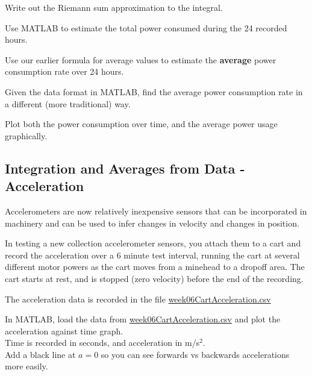 \newpage

\problem Write out the Riemann sum approximation to the integral.

\vfill
\vfill

Use MATLAB to estimate the total power consumed during the 24 recorded
hours.
\newpage

\problem Use our earlier formula for average values to estimate the
{\bf average} power consumption rate over 24 hours.

\vfill

Given the data format in MATLAB, find the average power consumption
rate in a different (more traditional) way.

\vfill

Plot both the power consumption over time, and the average power usage
graphically.  \vspace{1in}

\newpage

\subsection*{Integration and Averages from Data - Acceleration}

Accelerometers are now relatively inexpensive sensors that can be
incorporated in machinery and can be used to infer changes in velocity
and changes in position.

In testing a new collection accelerometer sensors, you attach them to
a cart and record the acceleration over a 6 minute test interval,
running the cart at several different motor powers as the cart moves
from a minehead to a dropoff area.  The cart starts at rest, and is
stopped (zero velocity) before the end of the recording.

The acceleration data is recorded in the file 
\href{http://www.mast.queensu.ca/~apsc171/MNTCP01/Notes/MATLAB/week06CartAcceleration.csv}{week06CartAcceleration.csv}

\newpage

\problem In MATLAB, load the data from
\href{http://www.mast.queensu.ca/~apsc171/MNTCP01/Notes/MATLAB/week06CartAcceleration.csv}{week06CartAcceleration.csv}
and plot the acceleration against time graph.  \\
Time is recorded in seconds, and acceleration in m/s$^2$. \\
Add a black line at $a = 0$ so you can see forwards vs backwards
accelerations more easily.

